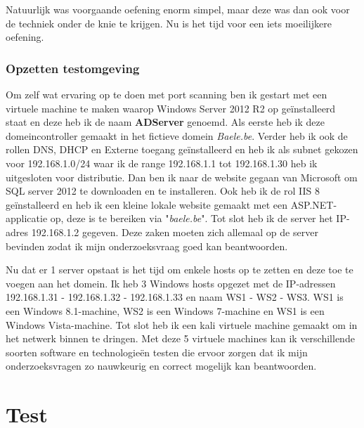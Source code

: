 \documentclass[pdftex,a4paper,12pt]{report}
\begin{document}
Natuurlijk was voorgaande oefening enorm simpel, maar deze was dan ook voor de techniek onder de knie te krijgen. Nu is het tijd voor een iets moeilijkere oefening.

\subsection{Opzetten testomgeving}
Om zelf wat ervaring op te doen met port scanning ben ik gestart met een virtuele machine te maken waarop Windows Server 2012 R2 op geïnstalleerd staat en deze heb ik de naam \textbf{ADServer} genoemd. Als eerste heb ik deze domeincontroller gemaakt in het fictieve domein \textit{Baele.be}. Verder heb ik ook de rollen DNS, DHCP en Externe toegang geïnstalleerd en heb ik als subnet gekozen voor 192.168.1.0/24 waar ik de range 192.168.1.1 tot 192.168.1.30 heb ik uitgesloten voor distributie. Dan ben ik naar de website gegaan van Microsoft om SQL server 2012 te downloaden en te installeren. Ook heb ik de rol IIS 8 geïnstalleerd en heb ik een kleine lokale website gemaakt met een ASP.NET-applicatie op, deze is te bereiken via "\textit{baele.be}". Tot slot heb ik de server het IP-adres 192.168.1.2 gegeven. Deze zaken moeten zich allemaal op de server bevinden zodat ik mijn onderzoeksvraag goed kan beantwoorden. \newline

Nu dat er 1 server opstaat is het tijd om enkele hosts op te zetten en deze toe te voegen aan het domein. Ik heb 3 Windows hosts opgezet met de IP-adressen 192.168.1.31 - 192.168.1.32 - 192.168.1.33 en naam WS1 - WS2 - WS3. WS1 is een Windows 8.1-machine, WS2 is een Windows 7-machine en WS1 is een Windows Vista-machine. Tot slot heb ik een kali virtuele machine gemaakt om in het netwerk binnen te dringen. Met deze 5 virtuele machines kan ik verschillende soorten software en technologieën testen die ervoor zorgen dat ik mijn onderzoeksvragen zo nauwkeurig en correct mogelijk kan beantwoorden. 

\subsection{}
\chapter{Test}

\end{document}
